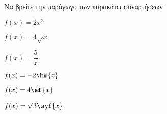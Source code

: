 Να βρείτε την παράγωγο των παρακάτω συναρτήσεων
\begin{multicols}{2}
\begin{alist}
\item $ f(x)=2x^3 $
\item $ f(x)=4\sqrt{x} $
\item $ f(x)=\dfrac{5}{x} $
\item $ f(x)=-2\hm{x} $
\item $ f(x)=4\ef{x} $
\item $ f(x)=\sqrt{3}\syf{x} $
\end{alist}
\end{multicols}
